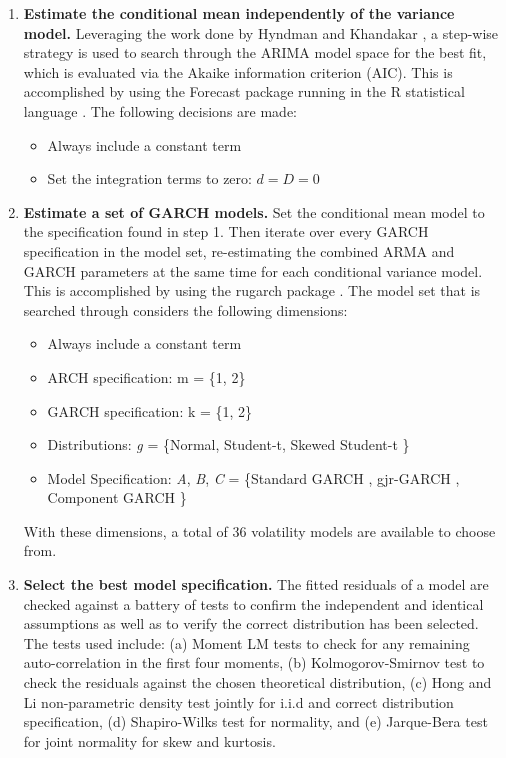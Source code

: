 \documentclass[12pt]{report}
\begin{document}
\begin{enumerate}
    \item \textbf{Estimate the conditional mean independently of the variance model.} Leveraging the work done by Hyndman and Khandakar \cite{HyndmanKhandakar2008AutoArima}, a step-wise strategy is used to search through the ARIMA model space for the best fit, which is evaluated via the Akaike information criterion (AIC). This is accomplished by using the Forecast package \cite{RForecast} running in the R statistical language \cite{RBase}. The following decisions are made: 
    
    \begin{itemize}
        \item Always include a constant term
        \item Set the integration terms to zero: $d = D = 0$
    \end{itemize}
    
    \item \textbf{Estimate a set of GARCH models.} Set the conditional mean model to the specification found in step 1. Then iterate over every GARCH specification in the model set, re-estimating the combined ARMA and GARCH parameters at the same time for each conditional variance model. This is accomplished by using the rugarch package \cite{Rugarch}. The model set that is searched through considers the following dimensions:
    
    \begin{itemize}
        \item Always include a constant term
        \item ARCH specification: m = \{1, 2\}
        \item GARCH specification: k = \{1, 2\}
        \item Distributions: \emph{g} = \{Normal, Student-t, Skewed Student-t \cite{FernandezSteel1998}\}
        \item Model Specification: \emph{A}, \emph{B}, \emph{C} = \{Standard GARCH \cite{Bollerslev1986Garch}, gjr-GARCH \cite{GJR1993Garch}, Component GARCH \cite{EngleLee1993APA} \}
    \end{itemize}
    
    With these dimensions, a total of 36 volatility models are available to choose from.

    \item \textbf{Select the best model specification.} The fitted residuals of a model are checked against a battery of tests to confirm the independent and identical assumptions as well as to verify the correct distribution has been selected. The tests used include: (a) Moment LM tests to check for any remaining auto-correlation in the first four moments, (b) Kolmogorov-Smirnov test to check the residuals against the chosen theoretical distribution, (c) Hong and Li \cite{HongLi2005} non-parametric density test jointly for i.i.d and correct distribution specification, (d) Shapiro-Wilks \cite{ShapiroWilks1965} test for normality, and (e) Jarque-Bera \cite{JarqueBera1980} test for joint normality for skew and kurtosis.
    

\end{enumerate}
\end{document}
